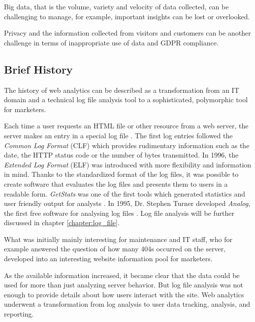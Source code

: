 Big data, that is the volume, variety and velocity of data collected, can be challenging to manage,
for example, important insights can be lost or overlooked.

Privacy and the information collected from visitors and customers can be another challenge in terms of inappropriate use of data and GDPR compliance.





\subsection{Brief History}
\label{chapter:web_analytics_history}

The history of web analytics can be described as a transformation from an IT domain and a technical log file analysis tool to a sophisticated, polymorphic tool for marketers.

Each time a user requests an HTML file or other resource from a web server, the server makes an entry in a special log file \cite{2014Singal}.
The first log entries followed the \textit{Common Log Format} (CLF) which provides rudimentary information such as the date, the HTTP status code or the number of bytes transmitted.
In 1996, the \textit{Extended Log Format} (ELF) was introduced with more flexibility and information in mind.
Thanks to the standardized format of the log files, it was possible to create software that evaluates the log files and presents them to users in a readable form.
\textit{GetStats} was one of the first tools which generated statistics and user friendly output for analysts \cite{2009Croll}. %
In 1995, Dr. Stephen Turner developed \textit{Analog}, the first free software for analysing log files \cite{2015Zheng}.
Log file analysis will be further discussed in chapter \ref{chapter:log_file}.

What was initially mainly interesting for maintenance and IT staff, who for example answered the question of how many 404s occurred on the server, developed into an interesting website information pool for marketers.

As the available information increased, it became clear that the data could be used for more than just analyzing server behavior.
But log file analysis was not enough to provide details about how users interact with the site.
Web analytics underwent a transformation from log analysis to user data tracking, analysis, and reporting.

